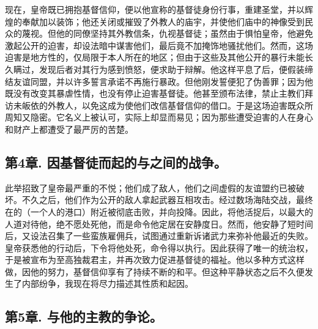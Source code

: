 现在，皇帝既已拥抱基督信仰，便以他宣称的基督徒身份行事，重建圣堂，并以辉煌的奉献加以装饰；他还关闭或摧毁了外教人的庙宇，并使他们庙中的神像受到民众的蔑视。但他的同僚坚持其外教信条，仇视基督徒；虽然由于惧怕皇帝，他避免激起公开的迫害，却设法暗中谋害他们，最后竟不加掩饰地骚扰他们。然而，这场迫害是地方性的，仅局限于本人所在的地区；但由于这些及其他公开的暴行未能长久瞒过，发现后者对其行为感到愤怒，便求助于辩解。他这样平息了后，便假装缔结友谊同盟，并以许多誓言承诺不再施行暴政。但他刚发誓便犯了伪善罪；因为他既没有改变其暴虐性情，也没有停止迫害基督徒。他甚至颁布法律，禁止主教们拜访未皈依的外教人，以免这成为使他们改信基督信仰的借口。于是这场迫害既众所周知又隐密。它名义上被认可，实际上却显而易见；因为那些遭受迫害的人在身心和财产上都遭受了最严厉的苦楚。\par


\subsection{第4章. 因基督徒而起的与之间的战争。}

此举招致了皇帝最严重的不悦；他们成了敌人，他们之间虚假的友谊盟约已被破坏。不久之后，他们作为公开的敌人拿起武器互相攻击。经过数场海陆交战，最终在的（一个人的港口）附近被彻底击败，并向投降。因此，将他活捉后，以最大的人道对待他，绝不愿处死他，而是命令他定居在安静度日。然而，他安静了短时间后，又设法召集了一些蛮族雇佣兵，试图通过重新诉诸武力来弥补他最近的失败。皇帝获悉他的行动后，下令将他处死，命令得以执行。因此获得了唯一的统治权，于是被宣布为至高独裁君主，并再次致力促进基督徒的福祉。他以多种方式这样做，因他的努力，基督信仰享有了持续不断的和平。但这种平静状态之后不久便发生了内部纷争，我现在将尽力描述其性质和起因。\par


\subsection{第5章. 与他的主教的争论。}

